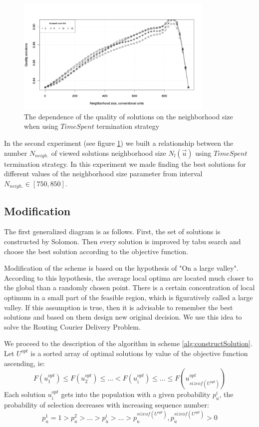 \documentclass[]{TAACpaper}
\begin{document}
\begin{figure}[h]
	\hfil\includegraphics[height=2.2in]{images/acceptedCountLimit}\hfil
	\caption{
	  The dependence of the quality of solutions on the neighborhood size when using $ TimeSpent $ termination strategy
	}
	
	\label{aba:fig4}
\end{figure}

In the second experiment (see figure \ref{aba:fig4}) we built a relationship between the number $N_{neigh.}$ of viewed solutions neighborhood size $N_l(\vec{u})$ using $TimeSpent$ termination strategy. In this experiment we made finding the best solutions for different values of the neighborhood size parameter from interval $N_{neigh.}\in[750, 850]$.

\subsection{Modification}

The first generalized diagram is as follows. First, the set of solutions is constructed by Solomon. Then every solution is improved by tabu search and choose the best solution according to the objective function.

Modification of the scheme is based on the hypothesis of "On a large valley"\cite{opt_Kochetov}. According to this hypothesis, the average local optima are located much closer to the global than a randomly chosen point. There is a certain concentration of local optimum in a small part of the feasible region, which is figuratively called a large valley. If this assumption is true, then it is advisable to remember the best solutions and based on them design new original decision. We use this idea to solve the  Routing Courier Delivery Problem.

We proceed to the description of the algorithm in scheme \ref{alg:constructSolution}. Let $U^{opt}$ is a sorted array of optimal solutions by value of the objective function ascending,  ie:
\begin{equation} \label{u_sorted}
F(u^{opt}_1) \leq F(u^{opt}_2) \leq \ldots < F(u^{opt}_i) \leq \ldots \leq F(u^{opt}_{sizeof(U^{opt})})
\end{equation}
Each solution $u^{opt}_i$ gets into the population with a given probability $p^i_u$, the probability of selection decreases with increasing sequence number:
\begin{equation} \label{p_sorted}
p^1_u = 1 > p^2_u > \ldots > p^i_u> \ldots   > p^{sizeof(U^{opt})}_u,  p^{sizeof(U^{opt})}_u > 0
\end{equation}
\end{document}
